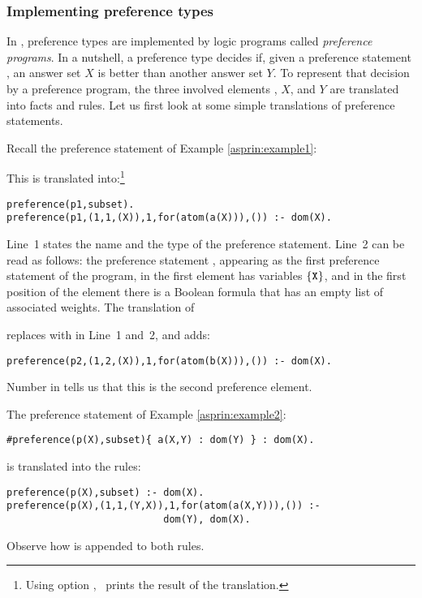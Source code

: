 \subsubsection{Implementing preference types}\label{asprin:implement}

In \asprin, preference types are implemented by logic programs called \emph{preference programs}.
In a nutshell, a preference type decides if, 
given a preference statement , 
an answer set $X$ is better than another answer set $Y$.
To represent that decision by a preference program, 
the three involved elements , $X$, and $Y$ are translated into facts and rules.
Let us first look at some simple translations of preference statements.
\begin{example}
\label{asprin:example1translated}
Recall the preference statement  of Example \ref{asprin:example1}:

This is translated into:\footnote{%
Using option , \asprin\ prints the result of the translation.}
\begin{lstlisting}
preference(p1,subset).
preference(p1,(1,1,(X)),1,for(atom(a(X))),()) :- dom(X).
\end{lstlisting}
Line~1 states the name and the type of the preference statement.
Line~2 can be read as follows:
the preference statement ,
appearing as the first preference statement of the program,
in the first element has variables $\{\texttt{X}\}$,
and in the first position of the element there is a Boolean formula  that has an empty list of associated weights.
The translation of 

replaces  with  in Line~1 and~2, and adds:
\begin{lstlisting}[numbers=none]
preference(p2,(1,2,(X)),1,for(atom(b(X))),()) :- dom(X).
\end{lstlisting}
Number  in  tells us that this is the second preference element. 
\end{example}

\begin{example}
The preference statement of Example \ref{asprin:example2}: 
\begin{lstlisting}[numbers=none]
#preference(p(X),subset){ a(X,Y) : dom(Y) } : dom(X).
\end{lstlisting}
is translated into the rules:
\begin{lstlisting}[numbers=none]
preference(p(X),subset) :- dom(X).
preference(p(X),(1,1,(Y,X)),1,for(atom(a(X,Y))),()) :-
                           dom(Y), dom(X).
\end{lstlisting}
Observe how  is appended to both rules. 
\end{example}

